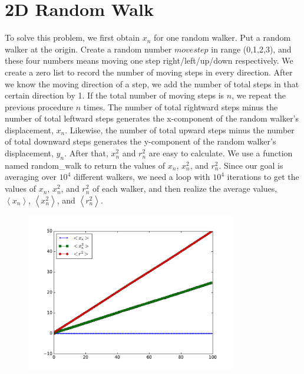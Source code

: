 \documentclass{article}
\begin{document}
\section{2D Random Walk}
To solve this problem, we first obtain $x_{n}$ for one random walker. Put a
random walker at the origin. Create a random number $movestep$ in range
(0,1,2,3), and these four numbers means moving one step right/left/up/down
respectively. We create a zero list to record the number of moving steps in every
direction. After we know the moving direction of a step, we add the number of
total steps in that certain direction by 1. If the total number of moving
steps is $n$, we repeat the previous procedure $n$ times. The number of
total rightward steps minus the number of total leftward steps generates the
x-component of the random walker's displacement, $x_{n}$. Likewise, the
number of total upward steps minus the number of total downward steps
generates the y-component of the random walker's displacement, $y_{n}$. 
After that, $x_{n}^{2}$ and $r_{n}^{2}$ are easy to calculate. We use a
function named random\_walk to return the values of $x_{n}$,  $x_{n}^{2}$,
and $r_{n}^{2}$. Since our goal is averaging over $10^{4}$ different
walkers, we need a loop with $10^{4}$ iterations to get the values of $%
x_{n}$, $x_{n}^{2}$, and $r_{n}^{2}$ of each walker, and then realize the
average values, $\left\langle x_{n}\right\rangle $, $\left\langle
x_{n}^{2}\right\rangle $, and $\left\langle r_{n}^{2}\right\rangle $. 
\begin{figure}[!ht]
	\centering
	\includegraphics[width=0.82\textwidth, clip]{RandomWalk.pdf}
	\caption{}
\end{figure}
\end{document}
